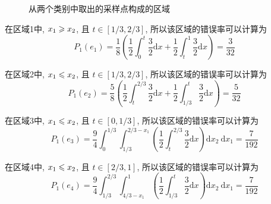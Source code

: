 \documentclass{article}
\begin{document}
\begin{figure}
  \centering
  \caption{从两个类别中取出的采样点构成的区域}
  \label{fig:sampleRange}
\end{figure}

在区域1中, $x_1\geqslant x_2$, 且 $t\in[1/3,2/3]$, 所以该区域的错误率可以计算为
\begin{equation}
  P_1(e_1)=\frac{1}{8}\left(\frac{1}{2}\int_{0}^t\frac{3}{2}\mathrm{d}x+\frac{1}{2}\int_t^{1}\frac{3}{2}\mathrm{d}x\right)=\frac{3}{32}
\end{equation}

在区域2中, $x_1\leqslant x_2$, 且 $t\in[1/3,2/3]$, 所以该区域的错误率可以计算为
\begin{equation}
  P_1(e_2)=\frac{5}{8}\left(\frac{1}{2}\int_{t}^{2/3}\frac{3}{2}\mathrm{d}x+\frac{1}{2}\int_{1/3}^{t}\frac{3}{2}\mathrm{d}x\right)=\frac{5}{32}
\end{equation}

在区域3中, $x_1\leqslant x_2$, 且 $t\in[0,1/3]$, 所以该区域的错误率可以计算为
\begin{equation}
  P_1(e_3)=\frac{9}{4}\int_0^{1/3}\int_{1/3}^{2/3-x_1}\left(\frac{1}{2}\int_t^{2/3}\frac{3}{2}\mathrm{d}x\right)\mathrm{d}x_2~\mathrm{d}x_1=\frac{7}{192}
\end{equation}

在区域4中, $x_1\leqslant x_2$, 且 $t\in[2/3,1]$, 所以该区域的错误率可以计算为
\begin{equation}
  P_1(e_4)=\frac{9}{4}\int_{1/3}^{2/3}\int_{4/3-x_1}^{1}\left(\frac{1}{2}\int_{1/3}^{t}\frac{3}{2}\mathrm{d}x\right)\mathrm{d}x_2~\mathrm{d}x_1=\frac{7}{192}
\end{equation}
\end{document}
